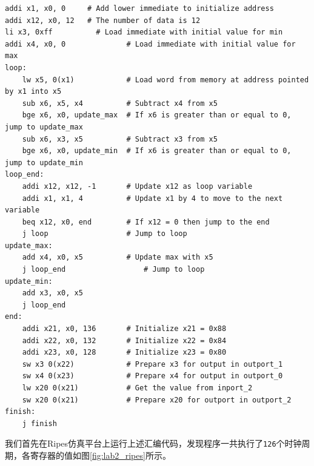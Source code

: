 \documentclass[a4paper,12pt]{article}
\begin{document}
    \begin{lstlisting}
addi x1, x0, 0     # Add lower immediate to initialize address
addi x12, x0, 12   # The number of data is 12
li x3, 0xff          # Load immediate with initial value for min
addi x4, x0, 0              # Load immediate with initial value for max
loop:
    lw x5, 0(x1)            # Load word from memory at address pointed by x1 into x5
    sub x6, x5, x4          # Subtract x4 from x5
    bge x6, x0, update_max  # If x6 is greater than or equal to 0, jump to update_max
    sub x6, x3, x5          # Subtract x3 from x5
    bge x6, x0, update_min  # If x6 is greater than or equal to 0, jump to update_min
loop_end:
    addi x12, x12, -1       # Update x12 as loop variable
    addi x1, x1, 4          # Update x1 by 4 to move to the next variable
    beq x12, x0, end        # If x12 = 0 then jump to the end
    j loop                  # Jump to loop
update_max:
    add x4, x0, x5          # Update max with x5
    j loop_end                  # Jump to loop
update_min:
    add x3, x0, x5
    j loop_end
end:
    addi x21, x0, 136       # Initialize x21 = 0x88
    addi x22, x0, 132       # Initialize x22 = 0x84
    addi x23, x0, 128       # Initialize x23 = 0x80
    sw x3 0(x22)            # Prepare x3 for output in outport_1
    sw x4 0(x23)            # Prepare x4 for output in outport_0
    lw x20 0(x21)           # Get the value from inport_2
    sw x20 0(x21)           # Prepare x20 for outport in outport_2
finish:
    j finish
    \end{lstlisting}

    我们首先在Ripes仿真平台上运行上述汇编代码，发现程序一共执行了\verb|126|个时钟周期，各寄存器的值如图\ref{fig:lab2_ripes}所示。
\end{document}
